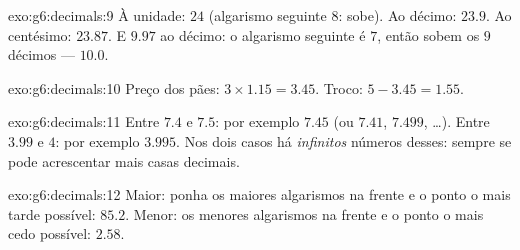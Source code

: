 \begin{solution}{exo:g6:decimals:9}
À unidade: $24$ (algarismo seguinte $8$: sobe). Ao décimo: $23.9$. Ao
centésimo: $23.87$. E $9.97$ ao décimo: o algarismo seguinte é $7$,
então sobem os $9$ décimos --- $10.0$.
\end{solution}

\begin{solution}{exo:g6:decimals:10}
Preço dos pães: $3 \times 1.15 = 3.45$. Troco: $5 - 3.45 = 1.55$.
\end{solution}

\begin{solution}{exo:g6:decimals:11}
Entre $7.4$ e $7.5$: por exemplo $7.45$ (ou $7.41$, $7.499$, \dots).
Entre $3.99$ e $4$: por exemplo $3.995$. Nos dois casos há
\emph{infinitos} números desses: sempre se pode acrescentar mais casas
decimais.
\end{solution}

\begin{solution}{exo:g6:decimals:12}
Maior: ponha os maiores algarismos na frente e o ponto o mais tarde
possível: $85.2$. Menor: os menores algarismos na frente e o ponto o
mais cedo possível: $2.58$.
\end{solution}

